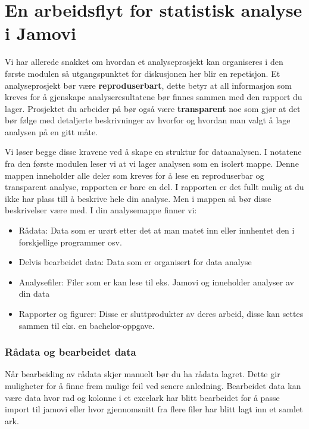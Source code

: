 \documentclass[
  letterpaper,
  DIV=11,
  numbers=noendperiod,
  oneside]{scrreprt}
\providecommand{\tightlist}{%
  \setlength{\itemsep}{0pt}\setlength{\parskip}{0pt}}\usepackage{longtable,booktabs,array}
\begin{document}
\hypertarget{en-arbeidsflyt-for-statistisk-analyse-i-jamovi}{%
\chapter{En arbeidsflyt for statistisk analyse i
Jamovi}\label{en-arbeidsflyt-for-statistisk-analyse-i-jamovi}}

Vi har allerede snakket om hvordan et analyseprosjekt kan organiseres i
den første modulen så utgangspunktet for diskusjonen her blir en
repetisjon. Et analyseprosjekt bør være \textbf{reproduserbart}, dette
betyr at all informasjon som kreves for å gjenskape analyseresultatene
bør finnes sammen med den rapport du lager. Prosjektet du arbeider på
bør også være \textbf{transparent} noe som gjør at det bør følge med
detaljerte beskrivninger av hvorfor og hvordan man valgt å lage analysen
på en gitt måte.

Vi løser begge disse kravene ved å skape en struktur for dataanalysen. I
notatene fra den første modulen leser vi at vi lager analysen som en
isolert mappe. Denne mappen inneholder alle deler som kreves for å lese
en reproduserbar og transparent analyse, rapporten er bare en del. I
rapporten er det fullt mulig at du ikke har plass till å beskrive hele
din analyse. Men i mappen så bør disse beskrivelser være med. I din
analysemappe finner vi:

\begin{itemize}
\tightlist
\item
  Rådata: Data som er urørt etter det at man matet inn eller innhentet
  den i forskjellige programmer osv.
\item
  Delvis bearbeidet data: Data som er organisert for data analyse
\item
  Analysefiler: Filer som er kan lese til eks. Jamovi og inneholder
  analyser av din data
\item
  Rapporter og figurer: Disse er sluttprodukter av deres arbeid, disse
  kan settes sammen til eks. en bachelor-oppgave.
\end{itemize}

\hypertarget{ruxe5data-og-bearbeidet-data}{%
\subsection{Rådata og bearbeidet
data}\label{ruxe5data-og-bearbeidet-data}}

Når bearbeiding av rådata skjer manuelt bør du ha rådata lagret. Dette
gir muligheter for å finne frem mulige feil ved senere anledning.
Bearbeidet data kan være data hvor rad og kolonne i et excelark har
blitt bearbeidet for å passe import til jamovi eller hvor gjennomsnitt
fra flere filer har blitt lagt inn et samlet ark.
\end{document}
